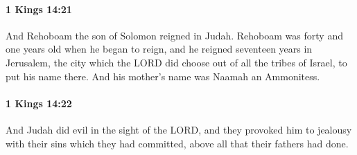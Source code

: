		\paragraph{1 Kings 14:21} %
			\label{1KINGS-14-21}

			And Rehoboam the son of Solomon reigned in Judah. Rehoboam was forty and one years old when he began to reign, and he reigned seventeen years in Jerusalem, the city which the LORD did choose out of all the tribes of Israel, to put his name there. And his mother’s name was Naamah an Ammonitess.


		\paragraph{1 Kings 14:22} %
			\label{1KINGS-14-22}

			And Judah did evil in the sight of the LORD, and they provoked him to jealousy with their sins which they had committed, above all that their fathers had done.

